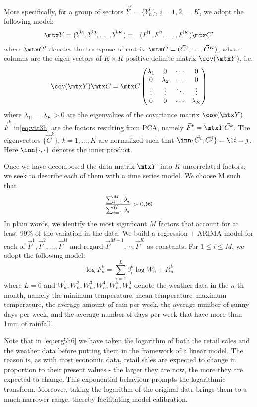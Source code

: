 \documentclass[a4paper,11pt,pdftex,twoside,titlepage]{article}
\begin{document}
More specifically, for a group of sectors $\vec Y^i = \{Y^i_n\}$,
$i = 1,2,\dots,K$, we adopt the following model:
\begin{eqnarray}
  \mtx Y = (\vec Y^1, \vec Y^2, \dots, \vec Y^K)
  &=& (\vec F^1, \vec F^2, \dots, \vec F^K) \mtx C' \label{eq:vtr3h}
\end{eqnarray}
where $\mtx C'$ denotes the transpose of matrix
$\mtx C = (\vec C^1, \dots, \vec C^K)$, whose columns are the eigen
vectors of $K\times K$ positive definite matrix $\cov(\mtx Y)$, i.e.
\[
  \cov(\mtx Y) \mtx C =  \mtx C
  \begin{pmatrix}
    \lambda_1 & 0 & \cdots & 0 \\
    0 & \lambda_2 & \cdots & 0 \\
    \vdots & \vdots & \ddots & \vdots \\
    0 & 0 & \cdots & \lambda_K
  \end{pmatrix}
\]
where $\lambda_1, \dots, \lambda_K > 0$ are the eigenvalues of the
covariance matrix $\cov(\mtx Y)$. $\vec F^k$ in\eqref{eq:vtr3h} are
the factors resulting from PCA, namely $\vec F^k = \mtx Y \vec C^k$.
The eigenvectors $\{\vec C^k\}$, $k=1,\dots, K$ are normalized such
that $\inn{\vec C^i, \vec C^j} = \1{i = j}$. Here $\inn{\cdot, \cdot}$
denotes the inner product.

Once we have decomposed the data matrix $\mtx Y$ into $K$ uncorrelated
factors, we seek to describe each of them with a time series model. We
choose M such that
\[
  {
    \sum_{i=1}^M \lambda_i
    \over
    \sum_{i=1}^K \lambda_i
  } > 0.99
\]
In plain words, we identify the most significant $M$ factors that
account for at least 99\% of the variation in the data. We build a
regression + ARIMA model for each of
$\vec F^1, \vec F^2, \dots, \vec F^M$ and regard
$\vec F^{M+1}, \cdots, \vec F^{K}$ as constants.
For $1 \leq i \leq M$, we adopt the following model:
\begin{equation}
  \label{eq:erg5h6}
  \log F^k_n = \sum_{i=1}^L \beta^k_i \log  W^i_n + R^k_n  
\end{equation}
where $L=6$ and $W^1_n, W^2_n, W^3_n, W^4_n, W^5_n, W^6_n$ denote
the weather data in the $n$-th month, namely the minimum temperature,
mean temperature, maximum temperature, the average amount of rain per
week, the average number of sunny days per week, and the average
number of days per week that have more than 1mm of rainfall.

Note that in \eqref{eq:erg5h6} we have taken the logarithm of both the
retail sales and the weather data before putting them in the framework
of a linear model. The reason is, as with most economic data, retail
sales are expected to change in proportion to their present values -
the larger they are now, the more they are expected to change. This
exponential behaviour prompts the logarithmic transform. Moreover,
taking the logarithm of the original data brings them to a much
narrower range, thereby facilitating model calibration.
\end{document}
